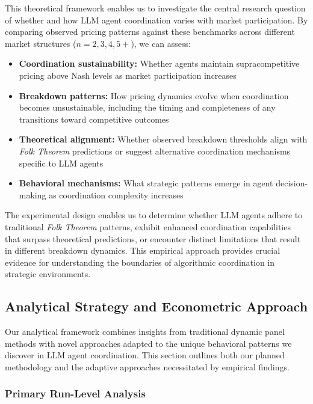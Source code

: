 This theoretical framework enables us to investigate the central research question of whether and how LLM agent coordination varies with market participation. By comparing observed pricing patterns against these benchmarks across different market structures ($n = 2, 3, 4, 5+$), we can assess:

\begin{itemize}
    \item \textbf{Coordination sustainability:} Whether agents maintain supracompetitive pricing above Nash levels as market participation increases
    \item \textbf{Breakdown patterns:} How pricing dynamics evolve when coordination becomes unsustainable, including the timing and completeness of any transitions toward competitive outcomes  
    \item \textbf{Theoretical alignment:} Whether observed breakdown thresholds align with \emph{Folk Theorem} predictions or suggest alternative coordination mechanisms specific to LLM agents
    \item \textbf{Behavioral mechanisms:} What strategic patterns emerge in agent decision-making as coordination complexity increases
\end{itemize}

The experimental design enables us to determine whether LLM agents adhere to traditional \emph{Folk Theorem} patterns, exhibit enhanced coordination capabilities that surpass theoretical predictions, or encounter distinct limitations that result in different breakdown dynamics. This empirical approach provides crucial evidence for understanding the boundaries of algorithmic coordination in strategic environments.

\subsection{Analytical Strategy and Econometric Approach}

Our analytical framework combines insights from traditional dynamic panel methods with novel approaches adapted to the unique behavioral patterns we discover in LLM agent coordination. This section outlines both our planned methodology and the adaptive approaches necessitated by empirical findings.

\subsubsection*{Primary Run-Level Analysis}

